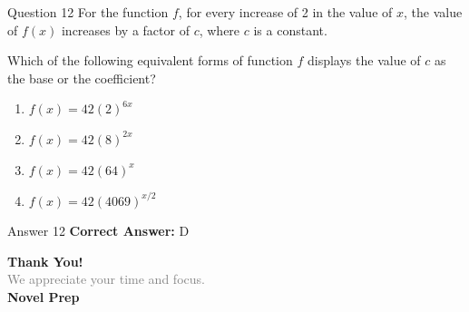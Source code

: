 \documentclass{beamer}
\begin{document}
\begin{frame}{Question 12}
\small
For the function \(f\), for every increase of 2 in the value of \(x\), the value of \(f(x)\) increases by a factor of \(c\), where \(c\) is a constant.

Which of the following equivalent forms of function \(f\) displays the value of \(c\) as the base or the coefficient?
\vspace{0.35cm}
\begin{enumerate}
    \item[A.] \(f(x) = 42(2)^{6x}\)
    \item[B.] \(f(x) = 42(8)^{2x}\)
    \item[C.] \(f(x) = 42(64)^x\)
    \item[D.] \(f(x) = 42(4069)^{x/2}\)
\end{enumerate}
\end{frame}
\begin{frame}{Answer 12}
\small
\textbf{Correct Answer:} D
\end{frame}

\begin{frame}{}
    \centering
    \vspace{5em}
    {\Huge \textbf{\textcolor{novelPurple}{Thank You!}}} \\[1em]
    {\large \textcolor{gray}{We appreciate your time and focus.}} \\[3em]
    {\LARGE \textbf{\textcolor{novelPurple}{\textsf{Novel Prep}}}}
    \vfill
\end{frame}
\end{document}
